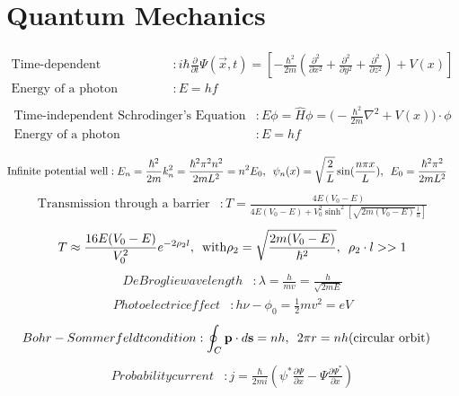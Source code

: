 \documentclass[12pt,a4paper]{article}
\begin{document}
	\section*{Quantum Mechanics}
	\begin{align*}
		\text{Time-dependent Schrodinger's Equation} & : i\hbar \frac{\partial}{\partial t} \Psi (\vec{x}, t) = [-\frac{\hbar^2}{2m}(\frac{\partial ^2}{\partial x^2} + \frac{\partial ^2}{\partial y ^2} + \frac{\partial^2}{\partial z^2}) + V(x)] \\
		\text{Energy of a photon} & : E = hf \\
	\end{align*}
		\begin{align*}
		\text{Time-independent Schrodinger's Equation} & : E\phi = \hat{H}\phi = \Big(-\frac{\hbar^2}{2m}\nabla^2 + V(x) \Big)\cdot \phi \\
		\text{Energy of a photon} & : E = hf \\
	\end{align*}
	\begin{align*}
		\text{Infinite potential well} & : E_n = \frac{\hbar^2}{2m}k_n^2 = \frac{\hbar^2 \pi^2 n^2}{2mL^2} = n^2 E_0, \hspace*{5pt} \psi_n (x) = \sqrt{\frac{2}{L}} \sin (\frac{n \pi x}{L}), \hspace*{5pt} E_0 = \frac{\hbar^2 \pi^2}{2mL^2}
	\end{align*}
	\begin{align*}
		\text{Transmission through a barrier} & : T = \frac{4E(V_0 - E)}{4E(V_0 - E) + V_0^2 \sinh^2 [\sqrt{2m(V_0 - E)}\frac{l}{h}]}
	\end{align*}
	\begin{align*}
	T \approx \frac{16E(V_0-E)}{V_0^2}e^{-2\rho_2 l}, \hspace*{5pt} \text{with} \rho_2 = \sqrt{\frac{2m(V_0-E)}{\hbar^2}}, \hspace*{5pt} \rho_2 \cdot l >> 1
	\end{align*}
	\begin{align*}
		De Broglie wavelength & : \lambda = \frac{h}{m v } = \frac{h}{\sqrt{2mE}}
	\end{align*}
		\begin{align*}
		Photoelectric effect & : h\nu - \phi_0 = \frac{1}{2} m v^2 = eV
	\end{align*}
	\begin{align*}
		Bohr-Sommerfeldt condition & : \oint_C \textbf{p} \cdot d\textbf{s} = nh, \hspace*{5pt} 2\pi r = nh \text{(circular orbit)}
	\end{align*}	
	\begin{align*}
		Probability current & : j = \frac{\hbar}{2mi} (\psi ^* \frac{\partial \Psi}{\partial x} - \Psi \frac{\partial \Psi ^*}{\partial x})
	\end{align*}
	
\end{document}
